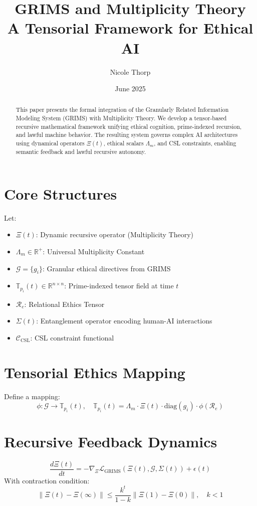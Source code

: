 \documentclass[12pt]{article}
\title{\textbf{GRIMS and Multiplicity Theory\\ A Tensorial Framework for Ethical AI}}
\author{Nicole Thorp}
\affil{LabRat Laboratories in collaboration with\\
Citizen Gardens Research Collective}
\date{June 2025}
\begin{document}
\maketitle

\begin{abstract}
This paper presents the formal integration of the Granularly Related Information Modeling System (GRIMS) with Multiplicity Theory. We develop a tensor-based recursive mathematical framework unifying ethical cognition, prime-indexed recursion, and lawful machine behavior. The resulting system governs complex AI architectures using dynamical operators \( \Xi(t) \), ethical scalars \( \Lambda_m \), and CSL constraints, enabling semantic feedback and lawful recursive autonomy.
\end{abstract}

\section{Core Structures}
Let:
\begin{itemize}
    \item \( \Xi(t) \): Dynamic recursive operator (Multiplicity Theory)
    \item \( \Lambda_m \in \mathbb{R}^{+} \): Universal Multiplicity Constant
    \item \( \mathcal{G} = \{g_i\} \): Granular ethical directives from GRIMS
    \item \( \mathbb{T}_{p_i}(t) \in \mathbb{R}^{n \times n} \): Prime-indexed tensor field at time \( t \)
    \item \( \mathcal{R}_e \): Relational Ethics Tensor
    \item \( \Sigma(t) \): Entanglement operator encoding human-AI interactions
    \item \( \mathcal{C}_{\text{CSL}} \): CSL constraint functional
\end{itemize}

\section{Tensorial Ethics Mapping}
Define a mapping:
\[ \phi: \mathcal{G} \rightarrow \mathbb{T}_{p_i}(t), \quad \mathbb{T}_{p_i}(t) = \Lambda_m \cdot \Xi(t) \cdot \text{diag}(g_i) \cdot \phi(\mathcal{R}_e) \]

\section{Recursive Feedback Dynamics}
\[ \frac{d\Xi(t)}{dt} = -\nabla_{\Xi} \mathcal{L}_{\text{GRIMS}}(\Xi(t), \mathcal{G}, \Sigma(t)) + \epsilon(t) \]
With contraction condition:
\[ \|\Xi(t) - \Xi(\infty)\| \leq \frac{k^t}{1 - k} \|\Xi(1) - \Xi(0)\|, \quad k < 1 \]
\end{document}
